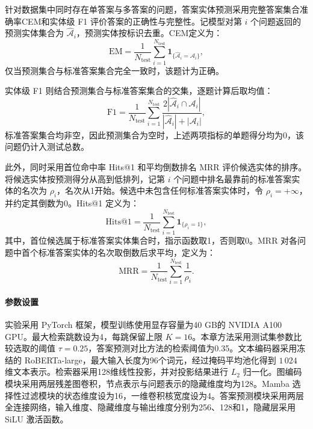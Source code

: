 针对数据集中同时存在单答案与多答案的问题，答案实体预测采用完整答案集合准确率CEM和实体级 F1 评价答案的正确性与完整性。记模型对第 $i$ 个问题返回的预测实体集合为 $\widehat{\mathcal{A}}_i$，预测实体按标识去重。CEM定义为：
\begin{equation}
\mathrm{EM}
=\frac{1}{N_{\mathrm{test}}}\sum_{i=1}^{N_{\mathrm{test}}}
\mathbf{1}_{\{\widehat{\mathcal{A}}_i=\mathcal{A}_i\}},
\label{eq:ch2-answer-set-exact}
\end{equation}
仅当预测集合与标准答案集合完全一致时，该题计为正确。

实体级 F1 则结合预测集合与标准答案集合的交集，逐题计算后取均值：
\begin{equation}
\mathrm{F1}
=\frac{1}{N_{\mathrm{test}}}\sum_{i=1}^{N_{\mathrm{test}}}
\frac{2|\widehat{\mathcal{A}}_i\cap\mathcal{A}_i|}
{|\widehat{\mathcal{A}}_i|+|\mathcal{A}_i|},
\label{eq:ch2-answer-entity-f1}
\end{equation}
标准答案集合均非空，因此预测集合为空时，上述两项指标的单题得分均为0，该问题仍计入测试总数。

此外，同时采用首位命中率 Hits@1 和平均倒数排名 MRR 评价候选实体的排序。将候选实体按预测得分从高到低排列，记第 $i$ 个问题中排名最靠前的标准答案实体的名次为 $\rho_i$，名次从1开始。候选中未包含任何标准答案实体时，令 $\rho_i=+\infty$，并约定其倒数为0。Hits@1 定义为：
\begin{equation}
\mathrm{Hits@1}=\frac{1}{N_{\mathrm{test}}}\sum_{i=1}^{N_{\mathrm{test}}}
\mathbf{1}_{\{\rho_i=1\}},
\label{eq:ch2-hits-at-one}
\end{equation}
其中，首位候选属于标准答案实体集合时，指示函数取1，否则取0。MRR 对各问题中首个标准答案实体的名次取倒数后求平均，定义为：
\begin{equation}
\mathrm{MRR}=\frac{1}{N_{\mathrm{test}}}\sum_{i=1}^{N_{\mathrm{test}}}\frac{1}{\rho_i}.
\label{eq:ch2-mrr}
\end{equation}


\paragraph{参数设置}

实验采用 PyTorch 框架，模型训练使用显存容量为40 GB的 NVIDIA A100 GPU。最大检索跳数设为4，每跳保留上限 $K=16$。本章方法采用测试集参数比较选取的阈值 $\tau=0.25$，答案预测对比方法的检索阈值为0.35。文本编码器采用冻结的 RoBERTa-large，最大输入长度为96个词元，经过掩码平均池化得到 $1\,024$ 维文本表示。检索器采用128维线性投影，并对投影结果进行 $L_2$ 归一化。图编码模块采用两层残差图卷积，节点表示与问题表示的隐藏维度均为128。Mamba 选择性过滤模块的状态维度设为16，一维卷积核宽度设为4。答案预测模块采用两层全连接网络，输入维度、隐藏维度与输出维度分别为256、128和1，隐藏层采用 SiLU 激活函数。

